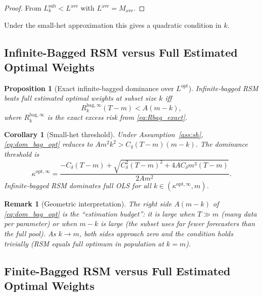 \documentclass[12pt,a4paper]{article}
\newtheorem{proposition}{Proposition}
\newtheorem{corollary}{Corollary}[proposition]
\newtheorem{remark}{Remark}
\theoremstyle{definition}
\begin{document}
\begin{proof}
From $L_k^{\mathrm{sub}}<L^{\mathrm{ave}}$ with $L^{\mathrm{ave}}=M_{\mathrm{ave}}$.
\end{proof}

Under the small-het approximation this gives a quadratic condition in $k$.

\subsection{Infinite-Bagged RSM versus Full Estimated Optimal Weights}

\begin{proposition}[Exact infinite-bagged dominance over $L^{\mathrm{opt}}$]
\label{prop:dom_bag_opt}
Infinite-bagged RSM beats full estimated optimal weights at subset size $k$ iff
\begin{equation}\label{eq:dom_bag_opt}
R_k^{\mathrm{bag},\infty}(T-m) < A(m-k),
\end{equation}
where $R_k^{\mathrm{bag},\infty}$ is the exact excess risk from \eqref{eq:Rbag_exact}.
\end{proposition}

\begin{corollary}[Small-het threshold]
Under Assumption~\ref{ass:sh}, \eqref{eq:dom_bag_opt} reduces to
$Am^2k^2>C_\delta(T-m)(m-k)$. The dominance threshold is
\begin{equation}\label{eq:kappa_opt}
\kappa^{\mathrm{opt},\infty}=\frac{-C_\delta(T-m)+\sqrt{C_\delta^2(T-m)^2+4AC_\delta m^3(T-m)}}{2Am^2}.
\end{equation}
Infinite-bagged RSM dominates full OLS for all $k\in(\kappa^{\mathrm{opt},\infty},m)$.
\end{corollary}

\begin{remark}[Geometric interpretation]
The right side $A(m-k)$ of \eqref{eq:dom_bag_opt} is the ``estimation budget'':
it is large when $T\gg m$ (many data per parameter) or when $m-k$ is large
(the subset uses far fewer forecasters than the full pool). As $k\to m$,
both sides approach zero and the condition holds trivially (RSM equals full
optimum in population at $k=m$).
\end{remark}

\subsection{Finite-Bagged RSM versus Full Estimated Optimal Weights}
\end{document}
